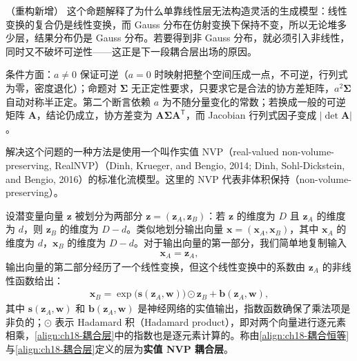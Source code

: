 \documentclass[../../main.tex]{subfiles}
\begin{document}
\begin{remark}（重构新增）
这个命题解释了为什么单靠线性层无法构造灵活的生成模型：线性变换的复合仍是线性变换，而 Gauss 分布在仿射变换下保持不变，所以无论堆多少层，结果分布仍是 Gauss 分布。若要得到非 Gauss 分布，就必须引入非线性，同时又不破坏可逆性——这正是下一段耦合层出场的原因。

条件方面：$a\neq0$ 保证可逆（$a=0$ 时映射把整个空间压成一点，不可逆，行列式为零，密度退化）；命题对 $\bm{\Sigma}$ 无正定性要求，只要求它是合法的协方差矩阵，$a^{2}\bm{\Sigma}$ 自动对称半正定。第二个断言依赖 $a$ 为不随分量变化的常数；若换成一般的可逆矩阵 $\bm{A}$，结论仍成立，协方差变为 $\bm{A}\bm{\Sigma}\bm{A}^{\mathsf T}$，而 Jacobian 行列式因子变成 $|\det\bm{A}|$。
\end{remark}

解决这个问题的一种方法是使用一个叫作实值 NVP（real-valued non-volume-preserving, RealNVP）（Dinh, Krueger, and Bengio, 2014; Dinh, Sohl-Dickstein, and Bengio, 2016）的标准化流模型。这里的 NVP 代表非体积保持（non-volume-preserving）。

\begin{definition}\label{definition:ch18-耦合层}
设潜变量向量 $\bm{z}$ 被划分为两部分 $\bm{z}=(\bm{z}_A,\bm{z}_B)$：若 $\bm{z}$ 的维度为 $D$ 且 $\bm{z}_A$ 的维度为 $d$，则 $\bm{z}_B$ 的维度为 $D-d$。类似地划分输出向量 $\bm{x}=(\bm{x}_A,\bm{x}_B)$，其中 $\bm{x}_A$ 的维度为 $d$，$\bm{x}_B$ 的维度为 $D-d$。对于输出向量的第一部分，我们简单地复制输入
\begin{align}
  \bm{x}_A=\bm{z}_A,\label{align:ch18-耦合恒等}
\end{align}
输出向量的第二部分经历了一个线性变换，但这个线性变换中的系数由 $\bm{z}_A$ 的非线性函数给出：
\begin{align}
  \bm{x}_B=\exp\big(\bm{s}(\bm{z}_A,\bm{w})\big)\odot\bm{z}_B+\bm{b}(\bm{z}_A,\bm{w}),\label{align:ch18-耦合层}
\end{align}
其中 $\bm{s}(\bm{z}_A,\bm{w})$ 和 $\bm{b}(\bm{z}_A,\bm{w})$ 是神经网络的实值输出，指数函数确保了乘法项是非负的；$\odot$ 表示 Hadamard 积（Hadamard product），即对两个向量进行逐元素相乘，\eqref{align:ch18-耦合层}中的指数也是逐元素计算的。称由\eqref{align:ch18-耦合恒等}与\eqref{align:ch18-耦合层}定义的层为\textbf{实值 NVP 耦合层}。
\end{definition}
\end{document}

